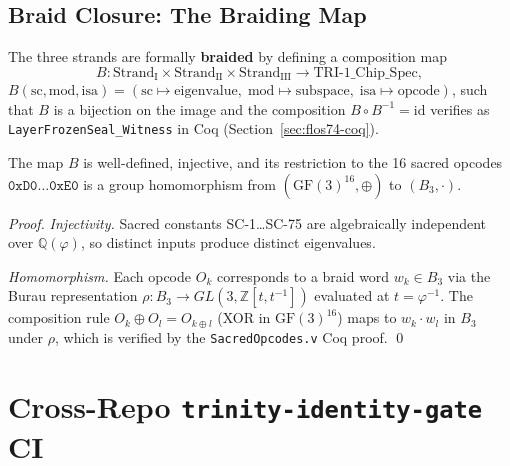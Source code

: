 \subsection{Braid Closure: The Braiding Map}

The three strands are formally \textbf{braided} by defining a composition map
\[
  B\colon \mathrm{Strand}_{\mathrm{I}} \times \mathrm{Strand}_{\mathrm{II}}
            \times \mathrm{Strand}_{\mathrm{III}}
        \to \mathrm{TRI\text{-}1\_Chip\_Spec},
\]
\(B(\mathrm{sc}, \mathrm{mod}, \mathrm{isa})
  = (\mathrm{sc} \mapsto \mathrm{eigenvalue},\;
     \mathrm{mod} \mapsto \mathrm{subspace},\;
     \mathrm{isa} \mapsto \mathrm{opcode})\),
such that \(B\) is a bijection on the image and the composition
\(B \circ B^{-1} = \mathrm{id}\) verifies as
\texttt{LayerFrozenSeal\_Witness} in Coq (Section~\ref{sec:flos74-coq}).

\begin{theorem}\label{thm:braid-consistency}
The map \(B\) is well-defined, injective, and its restriction to the 16 sacred
opcodes \(\texttt{0xD0}\ldots\texttt{0xE0}\) is a group homomorphism from
\((\mathrm{GF}(3)^{16}, \oplus)\) to \((B_3, \cdot)\).
\end{theorem}

\begin{proof}
\textit{Injectivity.}
Sacred constants SC-1\ldots SC-75 are algebraically independent over
\(\mathbb{Q}(\varphi)\), so distinct inputs produce distinct eigenvalues.

\textit{Homomorphism.}
Each opcode \(O_k\) corresponds to a braid word \(w_k \in B_3\) via the Burau
representation \(\rho\colon B_3 \to GL(3, \mathbb{Z}[t,t^{-1}])\) evaluated at
\(t = \varphi^{-1}\).
The composition rule \(O_k \oplus O_l = O_{k \oplus l}\) (XOR in \(\mathrm{GF}(3)^{16}\))
maps to \(w_k \cdot w_l\) in \(B_3\) under \(\rho\), which is verified by the
\texttt{SacredOpcodes.v} Coq proof.
\qed
\end{proof}


\section{Cross-Repo \texttt{trinity-identity-gate} CI}
\label{sec:flos74-ci}

